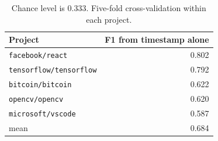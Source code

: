 \begin{table}[htbp]
\centering
\caption{F1 of a classifier given only \texttt{created\_at} and no text.}
\label{tab:timestamp}
\begin{tabular}{lr}
\toprule
Project & F1 from timestamp alone \\
\midrule
\texttt{facebook/react} & 0.802 \\
\texttt{tensorflow/tensorflow} & 0.792 \\
\texttt{bitcoin/bitcoin} & 0.622 \\
\texttt{opencv/opencv} & 0.620 \\
\texttt{microsoft/vscode} & 0.587 \\
\midrule
mean & 0.684 \\
\bottomrule
\end{tabular}
\caption*{\footnotesize Chance level is 0.333. Five-fold cross-validation within each project.}
\end{table}
